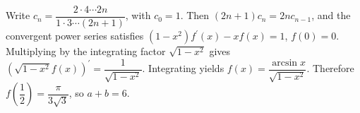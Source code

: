 Write $c_n = \dfrac{2\cdot4\cdots2n}{1\cdot3\cdots(2n+1)}$, with $c_0=1$. Then $(2n+1)c_n=2nc_{n-1}$, and the convergent power series satisfies $(1-x^2)f^{\prime}(x)-xf(x)=1$, $f(0)=0$. Multiplying by the integrating factor $\sqrt{1-x^2}$ gives $(\sqrt{1-x^2}f(x))^{\prime} = \dfrac{1}{\sqrt{1-x^2}}$. Integrating yields $f (x) = \dfrac{\arcsin x}{\sqrt{1-x^2}}$. Therefore $\boxed{f (\dfrac{1}{2}) = \dfrac{\pi}{3\sqrt3}}$, so $a+b=\boxed6$.
